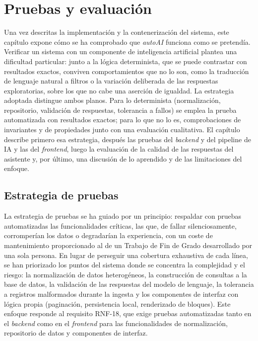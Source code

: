 \chapter{Pruebas y evaluación}
\label{cap:pruebas}

Una vez descritas la implementación y la contenerización del sistema, este
capítulo expone cómo se ha comprobado que \emph{autoAI} funciona como se
pretendía. Verificar un sistema con un componente de inteligencia artificial
plantea una dificultad particular: junto a la lógica determinista, que se puede
contrastar con resultados exactos, conviven comportamientos que no lo son, como
la traducción de lenguaje natural a filtros o la variación deliberada de las
respuestas exploratorias, sobre los que no cabe una aserción de igualdad. La
estrategia adoptada distingue ambos planos. Para lo determinista (normalización,
repositorio, validación de respuestas, tolerancia a fallos) se emplea la prueba
automatizada con resultados exactos; para lo que no lo es, comprobaciones de
invariantes y de propiedades junto con una evaluación cualitativa. El capítulo
describe primero esa estrategia, después las pruebas del \emph{backend} y del
pipeline de IA y las del \emph{frontend}, luego la evaluación de la calidad de
las respuestas del asistente y, por último, una discusión de lo aprendido y de
las limitaciones del enfoque.

\section{Estrategia de pruebas}
\label{sec:test-estrategia}

La estrategia de pruebas se ha guiado por un principio: respaldar con pruebas
automatizadas las funcionalidades críticas, las que, de fallar silenciosamente,
corromperían los datos o degradarían la experiencia, con un coste de
mantenimiento proporcionado al de un Trabajo de Fin de Grado desarrollado por una
sola persona. En lugar de perseguir una cobertura exhaustiva de cada línea, se
han priorizado los puntos del sistema donde se concentra la complejidad y el
riesgo: la normalización de datos heterogéneos, la construcción de consultas a la
base de datos, la validación de las respuestas del modelo de lenguaje, la
tolerancia a registros malformados durante la ingesta y los componentes de
interfaz con lógica propia (paginación, persistencia local, renderizado de
bloques). Este enfoque responde al requisito RNF-18, que exige pruebas
automatizadas tanto en el \emph{backend} como en el \emph{frontend} para las
funcionalidades de normalización, repositorio de datos y componentes de interfaz.

